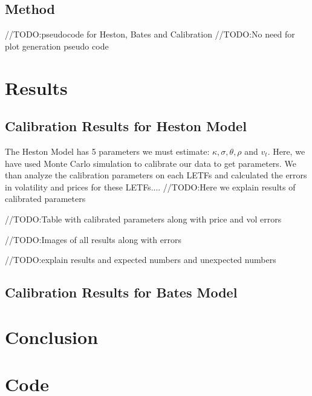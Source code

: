 \documentclass{article}
\begin{document}
\subsection{Method}

//TODO:pseudocode for Heston, Bates and Calibration
//TODO:No need for plot generation pseudo code

\section{Results}
\subsection{Calibration Results for Heston Model}
The Heston Model has 5 parameters we must estimate: $\kappa, \sigma, \theta, \rho$ and $v_t$. Here, we have used Monte Carlo simulation to calibrate our data to get parameters. We than analyze the calibration parameters on each LETFs and calculated the errors in volatility and prices for these LETFs....
//TODO:Here we explain results of calibrated parameters

//TODO:Table with calibrated parameters along with price and vol errors

//TODO:Images of all results along with errors

//TODO:explain results and expected numbers and unexpected numbers

\subsection{Calibration Results for Bates Model}

\section{Conclusion}
\section{Code}




\citep{ref1}
\citep{ref2}
\citep{ref3}
\citep{ref4}
\citep{ref5}
\citep{ref6}
\citep{ref7}
\citep{ref8}
\citep{ref9}
\end{document}
